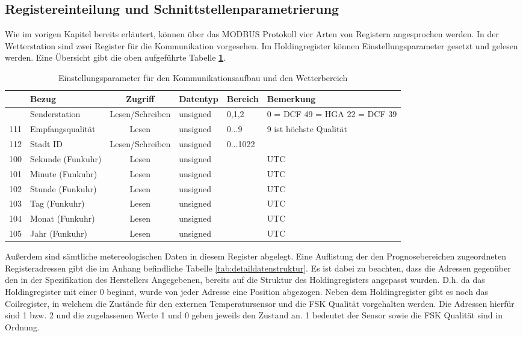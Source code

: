 \subsection{Registereinteilung und Schnittstellenparametrierung}
Wie im vorigen Kapitel bereits erläutert, können über das MODBUS Protokoll vier Arten von Registern angesprochen werden. In der Wetterstation sind zwei Register für die Kommunikation vorgesehen. Im Holdingregister können Einstellungsparameter gesetzt und gelesen werden.\label{comsetreg} Eine Übersicht gibt die oben aufgeführte Tabelle \textbf{\ref{tab:kommeinstpara}}.
\begin{table}[t]
\caption{Einstellungsparameter für den Kommunikationsaufbau und den Wetterbereich}
{
\setlength{\extrarowheight}{0.1cm}
\begin{tabular}{| c | l | c | l | l | p{2.5cm} |}
\hline
\textbf{\parbox[t]{1.8cm}{Register-\\adresse}} & \textbf{Bezug} & \textbf{Zugriff} & \textbf{Datentyp} & \textbf{Bereich} & \textbf{Bemerkung}\\[1cm]
\hline \hline
\hiderowcolors
110 & Senderstation & Lesen/Schreiben & unsigned & 0,1,2 & 0 = DCF 49 \newline 1 = HGA 22 \newline 2 = DCF 39\\
111 & Empfangsqualität & Lesen & unsigned & 0...9 & 9 ist höchste Qualität\\
112 & Stadt ID & Lesen/Schreiben & unsigned & 0...1022 & \\
100 & Sekunde (Funkuhr) & Lesen & unsigned & & UTC\\ 
101 & Minute (Funkuhr) & Lesen & unsigned & & UTC\\
102 & Stunde (Funkuhr) & Lesen & unsigned & & UTC\\
103 & Tag (Funkuhr) & Lesen & unsigned & & UTC\\
104 & Monat (Funkuhr) & Lesen & unsigned & & UTC\\
105 & Jahr (Funkuhr) & Lesen & unsigned & & UTC\\
\hline
\end{tabular}
}
\label{tab:kommeinstpara}
\end{table} 
Außerdem sind sämtliche metereologischen Daten in diesem Register abgelegt. Eine Auflistung der den Prognosebereichen zugeordneten Registeradressen gibt die im Anhang befindliche Tabelle \ref{tab:detaildatenstruktur}. Es ist dabei zu beachten, dass die Adressen gegenüber den in der Spezifikation des Herstellers Angegebenen, bereits auf die Struktur des Holdingregisters angepasst wurden. D.h. da das Holdingregister mit einer 0 beginnt, wurde von jeder Adresse eine Position abgezogen. Neben dem Holdingregister gibt es noch das Coilregister, in welchem die Zustände für den externen Temperatursensor und die FSK Qualität vorgehalten werden. Die Adressen hierfür sind 1 bzw. 2 und die zugelassenen Werte 1 und 0 geben jeweils den Zustand an. 1 bedeutet der Sensor sowie die FSK Qualität sind in Ordnung.\label{coilabfrage} 
